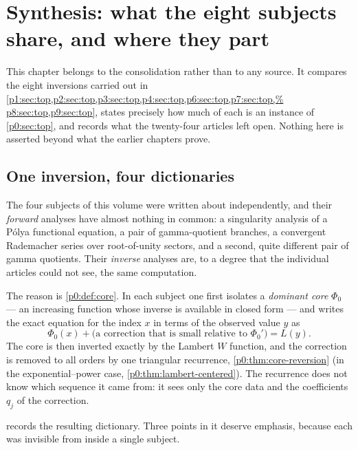 \documentclass[11pt,a4paper,oneside]{book}
\theoremstyle{plain}
\theoremstyle{definition}
\theoremstyle{remark}
\newcommand{\Wlam}{W}
\begin{document}
\chapter{Synthesis: what the eight subjects share, and where they part}
\label{p5:sec:top}

\begin{sourcebox}
This chapter belongs to the consolidation rather than to any source.  It
compares the eight inversions carried out in
\cref{p1:sec:top,p2:sec:top,p3:sec:top,p4:sec:top,p6:sec:top,p7:sec:top,%
p8:sec:top,p9:sec:top}, states precisely how much of each is an instance of
\cref{p0:sec:top}, and records what the twenty-four articles left open.  Nothing here is asserted beyond what the earlier chapters
prove.
\end{sourcebox}

\section{One inversion, four dictionaries}\label{p5:sec:one-inversion}

The four subjects of this volume were written about independently, and their
\emph{forward} analyses have almost nothing in common: a singularity analysis
of a Pólya functional equation, a pair of gamma-quotient branches, a
convergent Rademacher series over root-of-unity sectors, and a second, quite
different pair of gamma quotients.  Their \emph{inverse} analyses are, to a
degree that the individual articles could not see, the same computation.

The reason is \cref{p0:def:core}.  In each subject one first isolates a
\emph{dominant core} $\Phi_0$ --- an increasing function whose inverse is
available in closed form --- and writes the exact equation for the index $x$
in terms of the observed value $y$ as
\[
  \Phi_0(x)+\text{(a correction that is small relative to $\Phi_0'$)}=L(y).
\]
The core is then inverted exactly by the Lambert $\Wlam$ function, and the
correction is removed to all orders by one triangular recurrence,
\cref{p0:thm:core-reversion} (in the exponential--power case,
\cref{p0:thm:lambert-centered}).  The recurrence does not know which sequence
it came from: it sees only the core data and the coefficients $q_j$ of the
correction.

 records the resulting dictionary.  Three points in it
deserve emphasis, because each was invisible from inside a single subject.
\end{document}
